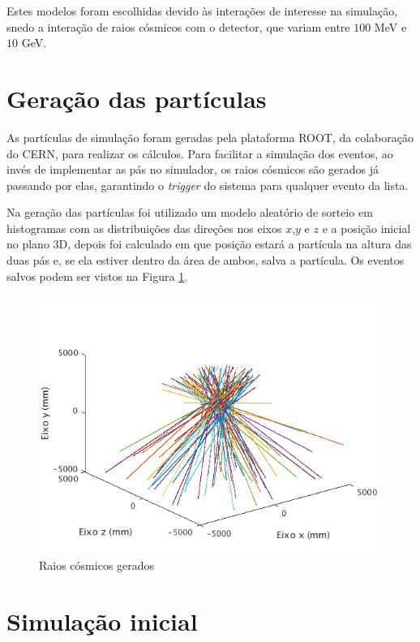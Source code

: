 Estes modelos foram escolhidas devido às interações de interesse na simulação, snedo a interação de raios cósmicos com o detector, que variam entre $100$ MeV e $10$ GeV.


\section{Geração das partículas}

As partículas de simulação foram geradas pela plataforma ROOT, da colaboração do \ac{CERN}, para realizar os cálculos. Para facilitar a simulação dos eventos, ao invés de implementar as pás no simulador, os raios cósmicos são gerados já passando por elas, garantindo o \emph{trigger} do sistema para qualquer evento da lista. 

 Na geração das partículas foi utilizado um modelo aleatório de sorteio em histogramas com as distribuições das direções nos eixos $x$,$y$ e $z$ e a posição inicial no plano 3D, \cite{amarogithub} depois foi calculado em que posição estará a partícula na altura das duas pás e, se ela estiver dentro da área de ambos, salva a partícula. Os eventos salvos podem ser vistos na Figura \ref{fig:geracao}.

\begin{figure}[H]
	\centering
	\includegraphics[width=16cm]{textuais/simulacao/figuras/geracao.png}
	\caption{Raios cósmicos gerados}
	\label{fig:geracao}
\end{figure}


\section{Simulação inicial}


